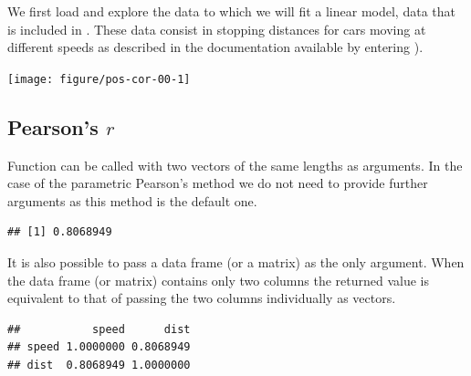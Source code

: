 \documentclass[krantz2]{krantz}\usepackage{knitr}%
\begin{document}
We first load and explore the data to which we will fit a linear model, data that is included in \Rpgrm. These data consist in stopping distances for cars moving at different speeds as described in the documentation available by entering ).

\begin{knitrout}\footnotesize
{}\color{fgcolor}\begin{kframe}
\begin{alltt}
\end{alltt}
\end{kframe}

{\centering \texttt{[image: figure/pos-cor-00-1]} 

}



\end{knitrout}
\label{chunk:plot:cars}

\subsection{Pearson's $r$}

Function  can be called with two vectors of the same lengths as arguments. In the case of the parametric Pearson's method we do not need to provide further arguments as this method is the default one.

\begin{knitrout}\footnotesize
{}\color{fgcolor}\begin{kframe}
\begin{alltt}
\hlstd{(} \hlopt{$}  \hlopt{$}
\end{alltt}
\begin{verbatim}
## [1] 0.8068949
\end{verbatim}
\end{kframe}
\end{knitrout}

It is also possible to pass a data frame (or a matrix) as the only argument. When the data frame (or matrix) contains only two columns the returned value is equivalent to that of passing the two columns individually as vectors.

\begin{knitrout}\footnotesize
{}\color{fgcolor}\begin{kframe}
\begin{alltt}
\end{alltt}
\begin{verbatim}
##           speed      dist
## speed 1.0000000 0.8068949
## dist  0.8068949 1.0000000
\end{verbatim}
\end{kframe}
\end{knitrout}
\end{document}
